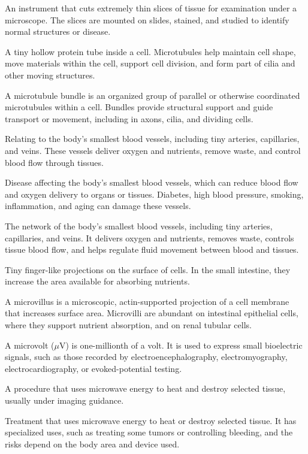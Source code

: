  An instrument that cuts extremely thin slices of tissue for examination under a microscope. The slices are mounted on slides, stained, and studied to identify normal structures or disease.

 A tiny hollow protein tube inside a cell. Microtubules help maintain cell shape, move materials within the cell, support cell division, and form part of cilia and other moving structures.

 A microtubule bundle is an organized group of parallel or otherwise coordinated microtubules within a cell. Bundles provide structural support and guide transport or movement, including in axons, cilia, and dividing cells.

 Relating to the body's smallest blood vessels, including tiny arteries, capillaries, and veins. These vessels deliver oxygen and nutrients, remove waste, and control blood flow through tissues.

 Disease affecting the body's smallest blood vessels, which can reduce blood flow and oxygen delivery to organs or tissues. Diabetes, high blood pressure, smoking, inflammation, and aging can damage these vessels.

 The network of the body's smallest blood vessels, including tiny arteries, capillaries, and veins. It delivers oxygen and nutrients, removes waste, controls tissue blood flow, and helps regulate fluid movement between blood and tissues.

 Tiny finger-like projections on the surface of cells. In the small intestine, they increase the area available for absorbing nutrients.

 A microvillus is a microscopic, actin-supported projection of a cell membrane that increases surface area. Microvilli are abundant on intestinal epithelial cells, where they support nutrient absorption, and on renal tubular cells.

 A microvolt ($\mu$V) is one-millionth of a volt. It is used to express small bioelectric signals, such as those recorded by electroencephalography, electromyography, electrocardiography, or evoked-potential testing.

 A procedure that uses microwave energy to heat and destroy selected tissue, usually under imaging guidance.

 Treatment that uses microwave energy to heat or destroy selected tissue. It has specialized uses, such as treating some tumors or controlling bleeding, and the risks depend on the body area and device used.

